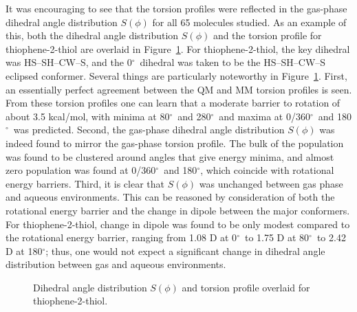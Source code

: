 \documentclass[12pt]{report}
\def\deg{$^{\circ}$}
\def\figlab{Figure}\def\figslab{\figlab s}
\newcommand*\fig[1]{\figlab~\ref{#1}}
\begin{document}
It was encouraging to see that the torsion profiles were reflected in the gas-phase dihedral angle distribution $S(\phi)$ for all 65 molecules studied. As an example of this, both the dihedral angle distribution $S(\phi)$ and the torsion profile for thiophene-2-thiol are overlaid in \fig{sphi}. For thiophene-2-thiol, the key dihedral was HS--SH--CW--S, and the 0\deg\ dihedral was taken to be the HS--SH--CW--S eclipsed conformer. Several things are particularly noteworthy in \fig{sphi}. First, an essentially perfect agreement between the QM and MM torsion profiles is seen. From these torsion profiles one can learn that a moderate barrier to rotation of about 3.5 kcal/mol, with minima at 80\deg\ and 280\deg\ and maxima at 0/360\deg\ and 180\deg\ was predicted. Second, the gas-phase dihedral angle distribution $S(\phi)$ was indeed found to mirror the gas-phase torsion profile. The bulk of the population was found to be clustered around angles that give energy minima, and almost zero population was found at 0/360\deg\ and 180\deg{}, which coincide with rotational energy barriers. Third, it is clear that $S(\phi)$ was unchanged between gas phase and aqueous environments. This can be reasoned by consideration of both the rotational energy barrier and the change in dipole between the major conformers. For thiophene-2-thiol, change in dipole was found to be only modest compared to the rotational energy barrier, ranging from 1.08 D at 0\deg\ to 1.75 D at 80\deg\ to 2.42 D at 180\deg; thus, one would not expect a significant change in dihedral angle distribution between gas and aqueous environments.

\begin{figure}[t]
\centering

\caption{Dihedral angle distribution $S(\phi)$ and torsion profile overlaid for thiophene-2-thiol.}
\label{sphi}
\end{figure}
\end{document}
